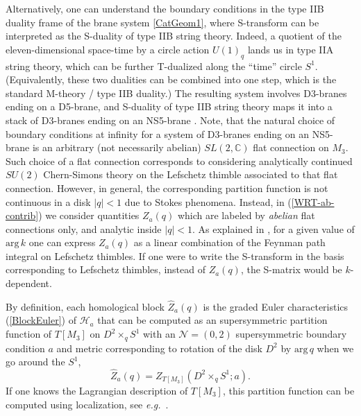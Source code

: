 \documentclass[hyper,letterpaper]{JHEP3}
\newcommand{\C}{{\mathbb C}}
\renewcommand{\hat}{\widehat}
\def\CH{{\mathcal H}}
\def\CN{{\mathcal N}}
\def\eg{{\textit{e.g.}}}
\begin{document}
Alternatively, one can understand the boundary conditions in the type IIB duality frame of the brane system \eqref{CatGeom1}, where S-transform can be interpreted
as the S-duality of type IIB string theory. Indeed, a quotient of the eleven-dimensional space-time by a circle action $U(1)_q$
lands us in type IIA string theory, which can be further T-dualized along the ``time'' circle $S^1$.
(Equivalently, these two dualities can be combined into one step, which is the standard M-theory / type IIB duality.)
The resulting system involves D3-branes ending on a D5-brane, and S-duality of type IIB string theory maps it
into a stack of D3-branes ending on an NS5-brane \cite{Witten:2011zz}.
Note, that the natural choice of boundary conditions at infinity for a system of D3-branes ending on an NS5-brane is an arbitrary (not necessarily abelian) $SL(2,\C)$ flat connection on $M_3$. Such choice of a flat connection corresponds to considering analytically continued $SU(2)$ Chern-Simons theory on the Lefschetz thimble associated to that flat connection.
However, in general, the corresponding partition function is not continuous in a disk $|q|<1$ due to Stokes phenomena.
Instead, in (\ref{WRT-ab-contrib}) we consider quantities $Z_a(q)$ which are labeled by {\it abelian} flat connections only,
and analytic inside $|q|<1$. As explained in \cite{Gukov:2016njj}, for a given value of $\text{arg}\,k$ one can express $Z_a(q)$ as a linear combination of the Feynman path integral on Lefschetz thimbles. If one were to write the S-transform in the basis corresponding to Lefschetz thimbles, instead of $Z_a(q)$, the S-matrix would be $k$-dependent.

By definition, each homological block $\hat{Z}_a(q)$ is the graded Euler characteristics (\ref{BlockEuler}) of $\CH_a$
that can be computed as an supersymmetric partition function of $T[M_3]$ on $D^2\times_q S^1$ with an $\CN=(0,2)$ supersymmetric
boundary condition $a$ and metric corresponding to rotation of the disk $D^2$ by $\mathrm{arg}\,q$ when we go around the $S^1$,
\begin{equation}
	\hat{Z}_a(q)=Z_{T[M_3]}(D^2\times_q S^1;a).
	\label{BlockD2S1}
\end{equation}
If one knows the Lagrangian description of $T[M_3]$, this partition function can be computed using localization, see \eg~\cite{Yoshida:2014ssa}.
\end{document}
